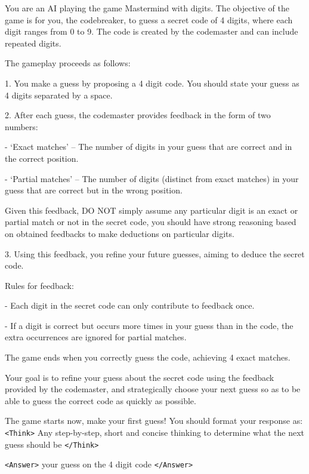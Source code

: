\begin{tcolorbox}[colback=gray!20, colframe=black, title=Mastermind Agent Prompt]
You are an AI playing the game Mastermind with digits. The objective of the game is for you, the codebreaker, to guess a secret code of 4 digits, where each digit ranges from 0 to 9. The code is created by the codemaster and can include repeated digits.

The gameplay proceeds as follows:

1. You make a guess by proposing a 4 digit code. You should state your guess as 4 digits separated by a space.

2. After each guess, the codemaster provides feedback in the form of two numbers:

    - `Exact matches' – The number of digits in your guess that are correct and in the correct position.
    
    - `Partial matches' – The number of digits (distinct from exact matches) in your guess that are correct but in the wrong position. 
    
Given this feedback, DO NOT simply assume any particular digit is an exact or partial match or not in the secret code, you should have strong reasoning based on obtained feedbacks to make deductions on particular digits. 

3. Using this feedback, you refine your future guesses, aiming to deduce the secret code.

Rules for feedback:

- Each digit in the secret code can only contribute to feedback once. 

- If a digit is correct but occurs more times in your guess than in the code, the extra occurrences are ignored for partial matches.

The game ends when you correctly guess the code, achieving 4 exact matches. 

Your goal is to refine your guess about the secret code using the feedback provided by the codemaster, and strategically choose your next guess so as to be able to guess the correct code as quickly as possible.

The game starts now, make your first guess! You should format your response as: \texttt{<Think>} Any step-by-step, short and concise thinking to determine what the next guess should be \texttt{</Think>}

\texttt{<Answer>} your guess on the 4 digit code \texttt{</Answer>}
\end{tcolorbox}

